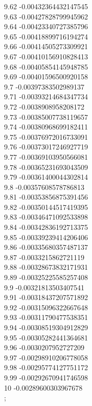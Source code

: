 {9.62	-0.00432364432147545\\
9.63	-0.00427828799945962\\
9.64	-0.00423340727385796\\
9.65	-0.00418899716194274\\
9.66	-0.00414505273309921\\
9.67	-0.00410156910828413\\
9.68	-0.00405854145948785\\
9.69	-0.00401596500920158\\
9.7	-0.00397383502989137\\
9.71	-0.00393214684347734\\
9.72	-0.0038908958208172\\
9.73	-0.00385007738119657\\
9.74	-0.00380968699182411\\
9.75	-0.00376972016733091\\
9.76	-0.00373017246927719\\
9.77	-0.00369103950566081\\
9.78	-0.00365231693043509\\
9.79	-0.00361400044302814\\
9.8	-0.00357608578786813\\
9.81	-0.00353856875391456\\
9.82	-0.00350144517419395\\
9.83	-0.00346471092533898\\
9.84	-0.00342836192713375\\
9.85	-0.00339239414206406\\
9.86	-0.00335680357487137\\
9.87	-0.0033215862721119\\
9.88	-0.00328673832171931\\
9.89	-0.00325225585257408\\
9.9	-0.00321813503407541\\
9.91	-0.00318437207571892\\
9.92	-0.00315096322667648\\
9.93	-0.00311790477538351\\
9.94	-0.00308519304912829\\
9.95	-0.00305282441364681\\
9.96	-0.0030207952727209\\
9.97	-0.00298910206778058\\
9.98	-0.00295774127751172\\
9.99	-0.00292670941746598\\
10	-0.00289600303967678\\
};

